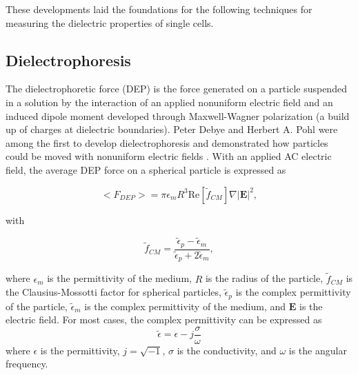  
 \par These developments laid the foundations for the following techniques for measuring the dielectric properties of single cells. 
 
 \subsection{Dielectrophoresis}
 \par The dielectrophoretic force (DEP) is the force generated on a particle suspended in a solution by the interaction of an applied nonuniform electric field and an induced dipole moment developed through Maxwell-Wagner polarization (a build up of charges at dielectric boundaries). Peter Debye and Herbert A. Pohl were among the first to develop dielectrophoresis and demonstrated how particles could be moved with nonuniform electric fields \cite{muller_potential_2003}. With an applied AC electric field, the average DEP force on a spherical particle is expressed as \cite{morgan_single_2007, green_dielectrophoresis_1999}
 
 \begin{equation}
     \big< F_{DEP} \big> = \pi \epsilon_m R^3 \text{Re}[\tilde{f}_{CM}] \nabla |\textbf{E}|^2, 
     \label{eqn:dep_force}
 \end{equation}
 
 \noindent with
 
 \begin{equation}
     \tilde{f}_{CM} = \frac{\tilde{\epsilon}_p - \tilde{\epsilon}_m}{\tilde{\epsilon}_p + 2\tilde{\epsilon}_m}, 
     \label{eqn:fcm_background}
 \end{equation}
 
 \noindent where $\epsilon_m$ is the permittivity of the medium, $R$ is the radius of the particle, $\tilde{f}_{CM}$ is the Clausius-Mossotti factor for spherical particles,  $\tilde{\epsilon}_p$ is the complex permittivity of the particle, $\tilde{\epsilon}_m$ is the complex permittivity of the medium, and $\textbf{E}$ is the electric field. For most cases, the complex permittivity can be expressed as 
 \begin{equation}
     \tilde{\epsilon} = \epsilon - j\frac{\sigma}{\omega}
 \end{equation}
\noindent where $\epsilon$ is the permittivity, $j = \sqrt{-1}$, $\sigma$ is the conductivity, and $\omega$ is the angular frequency. 

